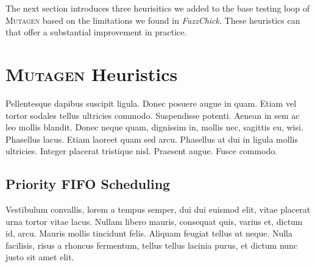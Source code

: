\documentclass[acmsmall, anonymous]{acmart}
\newcommand{\fuzzchick}{\textit{FuzzChick}\xspace}
\newcommand{\mutagen}{\textsc{Mutagen}\xspace}
\begin{document}
The next section introduces three heurisitics we added to the base testing loop
of \mutagen based on the limitations we found in \fuzzchick.
%
These heuristics can that offer a substantial improvement in practice.

\section{\mutagen Heuristics}
\label{sec:heuristics}

Pellentesque dapibus suscipit ligula. Donec posuere augue in quam. Etiam vel
tortor sodales tellus ultricies commodo. Suspendisse potenti. Aenean in sem ac
leo mollis blandit. Donec neque quam, dignissim in, mollis nec, sagittis eu,
wisi. Phasellus lacus. Etiam laoreet quam sed arcu. Phasellus at dui in ligula
mollis ultricies. Integer placerat tristique nisl. Praesent augue. Fusce
commodo.

\subsection{Priority FIFO Scheduling}

Vestibulum convallis, lorem a tempus semper, dui dui euismod elit,
vitae placerat urna tortor vitae lacus. Nullam libero mauris, consequat quis,
varius et, dictum id, arcu. Mauris mollis tincidunt felis. Aliquam feugiat
tellus ut neque. Nulla facilisis, risus a rhoncus fermentum, tellus tellus
lacinia purus, et dictum nunc justo sit amet elit.
\end{document}
